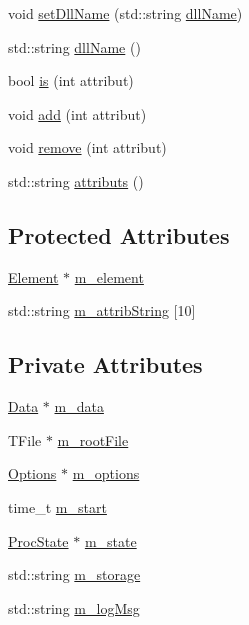 \begin{DoxyCompactItemize}
void \hyperlink{classObject_a870c5af919958c2136623b2d7816d123}{set\+Dll\+Name} (std\+::string \hyperlink{classObject_a2e3947f2870094c332d7454117f3ec63}{dll\+Name})
\item 
std\+::string \hyperlink{classObject_a2e3947f2870094c332d7454117f3ec63}{dll\+Name} ()
\item 
bool \hyperlink{classAttrib_a704f26af560909ad22065083bb7d4c34}{is} (int attribut)
\item 
void \hyperlink{classAttrib_a235f773af19c900264a190b00a3b4ad7}{add} (int attribut)
\item 
void \hyperlink{classAttrib_a7d4ef7e32d93cb287792b87b857e79f3}{remove} (int attribut)
\item 
std\+::string \hyperlink{classAttrib_aee7bbf16b144887f196e1341b24f8a26}{attributs} ()
\end{DoxyCompactItemize}
\subsection*{Protected Attributes}
\begin{DoxyCompactItemize}
\item 
\hyperlink{classElement}{Element} $\ast$ \hyperlink{classProcessus_aa9d24d53c3e52f36786cabb5d8e296e7}{m\+\_\+element}
\item 
std\+::string \hyperlink{classAttrib_a3414521d7a82476e874b25a5407b5e63}{m\+\_\+attrib\+String} \mbox{[}10\mbox{]}
\end{DoxyCompactItemize}
\subsection*{Private Attributes}
\begin{DoxyCompactItemize}
\item 
\hyperlink{classData}{Data} $\ast$ \hyperlink{classProcessus_a3da9a9de8af54e2f47807a3e09dfccff}{m\+\_\+data}
\item 
T\+File $\ast$ \hyperlink{classProcessus_a76114f8cf2111e910c323a7ae05a015d}{m\+\_\+root\+File}
\item 
\hyperlink{classOptions}{Options} $\ast$ \hyperlink{classProcessus_a74205f3c1e00c4448f7b3257c2351797}{m\+\_\+options}
\item 
time\+\_\+t \hyperlink{classProcessus_a8ec00b2e12c5beada932610f30218e93}{m\+\_\+start}
\item 
\hyperlink{structProcState}{Proc\+State} $\ast$ \hyperlink{classProcessus_ab3539eee42891ceae0baf4395ae7fb61}{m\+\_\+state}
\item 
std\+::string \hyperlink{classProcessus_a132b1e71f72327e5a87f0a168c7b6325}{m\+\_\+storage}
\item 
std\+::string \hyperlink{classProcessus_a3bc0140a3a69a83951ab7f9986bd2c84}{m\+\_\+log\+Msg}
\end{DoxyCompactItemize}


